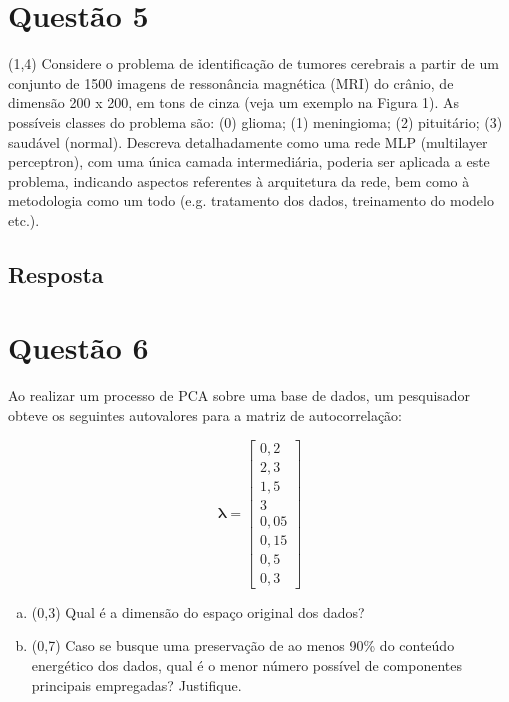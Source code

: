 \documentclass[final,3p]{elsarticle}
\numberwithin{equation}{section}
\begin{document}
\section{Questão 5}

    (1,4) Considere o problema de identificação de tumores cerebrais a partir de um conjunto de 1500 imagens de ressonância magnética (MRI) do crânio, de dimensão 200 x 200, em tons de cinza (veja um exemplo na Figura 1).
    As possíveis classes do problema são: (0) glioma; (1) meningioma; (2) pituitário; (3) saudável (normal). Descreva detalhadamente como uma rede MLP (multilayer perceptron), com uma única camada intermediária, poderia ser aplicada a este problema, indicando aspectos referentes à arquitetura da rede, bem como à metodologia como um todo (e.g. tratamento dos dados, treinamento do modelo etc.).

    \subsection{Resposta}


\section{Questão 6}

    Ao realizar um processo de PCA sobre uma base de dados, um pesquisador obteve os seguintes autovalores para a matriz de autocorrelação:

    \begin{equation}
        \mathbf{\lambda{}} =
        \begin{bmatrix}
            0,2 \\
            2,3 \\
            1,5 \\
            3 \\
            0,05 \\
            0,15 \\
            0,5 \\
            0,3
        \end{bmatrix}
    \end{equation}

    \begin{enumerate}[(a)]
        \item (0,3) Qual é a dimensão do espaço original dos dados?
        \item (0,7) Caso se busque uma preservação de ao menos 90\% do conteúdo energético dos dados, qual é o menor número possível de componentes principais empregadas? Justifique.
    \end{enumerate}
\end{document}
